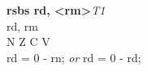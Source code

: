 


\begin{instructionblock}{\imagewidth}%
    \textbf{rsbs rd, <rm>}\hfill\textit{T1}\\
    rd, rm \baseregisters\\
    {N Z C V}\\
    rd = 0 - rn; \textit{or} rd = 0 - rd;
\end{instructionblock}

